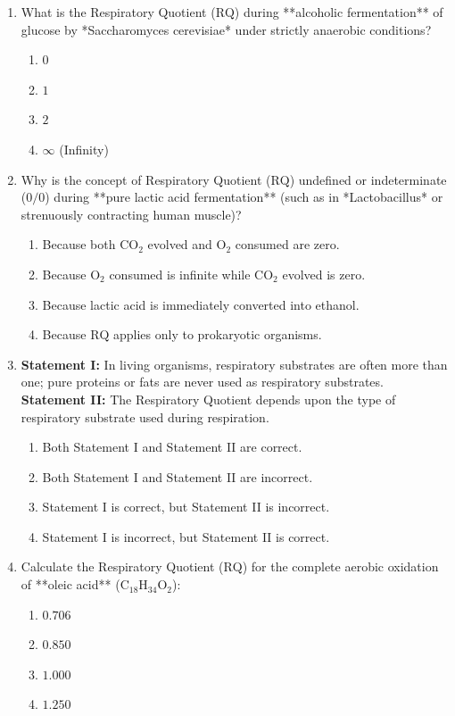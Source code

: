\documentclass[11pt, a4paper]{article}
\begin{document}
\begin{enumerate}[label=\textbf{\arabic*.}]
\item What is the Respiratory Quotient ($\text{RQ}$) during **alcoholic fermentation** of glucose by *Saccharomyces cerevisiae* under strictly anaerobic conditions?
\begin{enumerate}[label=(\Alph*)]
    \item $0$
    \item $1$
    \item $2$
    \item $\infty$ (Infinity)
\end{enumerate}

\item Why is the concept of Respiratory Quotient ($\text{RQ}$) undefined or indeterminate ($0/0$) during **pure lactic acid fermentation** (such as in *Lactobacillus* or strenuously contracting human muscle)?
\begin{enumerate}[label=(\Alph*)]
    \item Because both $\text{CO}_2$ evolved and $\text{O}_2$ consumed are zero.
    \item Because $\text{O}_2$ consumed is infinite while $\text{CO}_2$ evolved is zero.
    \item Because lactic acid is immediately converted into ethanol.
    \item Because $\text{RQ}$ applies only to prokaryotic organisms.
\end{enumerate}

\item \textbf{Statement I:} In living organisms, respiratory substrates are often more than one; pure proteins or fats are never used as respiratory substrates. \\
\textbf{Statement II:} The Respiratory Quotient depends upon the type of respiratory substrate used during respiration.
\begin{enumerate}[label=(\Alph*)]
    \item Both Statement I and Statement II are correct.
    \item Both Statement I and Statement II are incorrect.
    \item Statement I is correct, but Statement II is incorrect.
    \item Statement I is incorrect, but Statement II is correct.
\end{enumerate}

\item Calculate the Respiratory Quotient ($\text{RQ}$) for the complete aerobic oxidation of **oleic acid** ($\text{C}_{18}\text{H}_{34}\text{O}_2$):
\begin{enumerate}[label=(\Alph*)]
    \item $0.706$
    \item $0.850$
    \item $1.000$
    \item $1.250$
\end{enumerate}


\end{enumerate}
\end{document}
